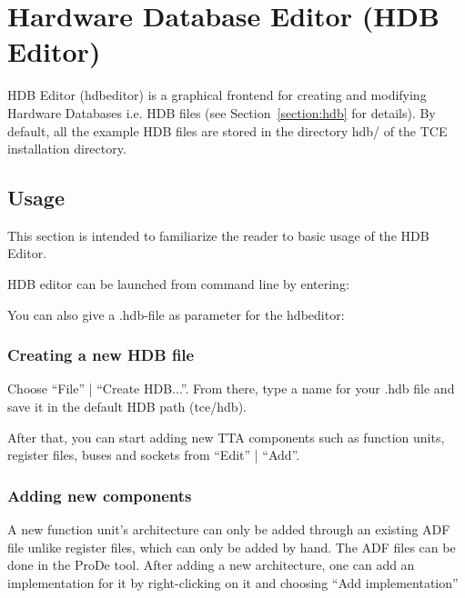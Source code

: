 \documentclass[twoside]{tceusermanual}
\begin{document}
\section{Hardware Database Editor (HDB Editor)}
\label{sec:hdbedit}
 

HDB Editor (hdbeditor) is a graphical frontend for creating and
modifying Hardware Databases i.e. HDB files (see Section~\ref{section:hdb}
for details). By default, all the example HDB files are stored in the directory
hdb/ of the TCE installation directory.

\subsection{Usage}

This section is intended to familiarize the reader to basic usage of the HDB
Editor.

HDB editor can be launched from command line by entering:


You can also give a .hdb-file as parameter for the hdbeditor:


\subsubsection{Creating a new HDB file}

Choose ``File'' | ``Create HDB...''. 
From there, type a name for your .hdb file and save it in the default HDB path
(tce/hdb).

After that, you can start adding new TTA components such as function units,
register files, buses and sockets from ``Edit'' | ``Add''.

\subsubsection{Adding new components}
A new function unit's architecture can only be added through an existing ADF
file unlike register files, which can only be added by hand. The ADF files
can be done in the ProDe tool. After adding a new architecture, one can add an
implementation for it by right-clicking on it and choosing ``Add
implementation''
\end{document}
